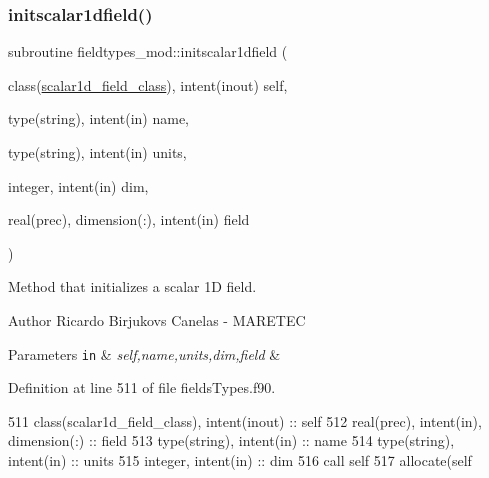 \subsubsection{\texorpdfstring{initscalar1dfield()}{initscalar1dfield()}}
{\footnotesize\ttfamily subroutine fieldtypes\+\_\+mod\+::initscalar1dfield (\begin{DoxyParamCaption}\item[{class(\mbox{\hyperlink{structfieldtypes__mod_1_1scalar1d__field__class}{scalar1d\+\_\+field\+\_\+class}}), intent(inout)}]{self,  }\item[{type(string), intent(in)}]{name,  }\item[{type(string), intent(in)}]{units,  }\item[{integer, intent(in)}]{dim,  }\item[{real(prec), dimension(\+:), intent(in)}]{field }\end{DoxyParamCaption})\hspace{0.3cm}{\ttfamily [private]}}



Method that initializes a scalar 1D field. 

\begin{DoxyAuthor}{Author}
Ricardo Birjukovs Canelas -\/ M\+A\+R\+E\+T\+EC 
\end{DoxyAuthor}

\begin{DoxyParams}[1]{Parameters}
\mbox{\tt in}  & {\em self,name,units,dim,field} & \\
\hline
\end{DoxyParams}


Definition at line 511 of file fields\+Types.\+f90.


\begin{DoxyCode}
511     \textcolor{keywordtype}{class}(scalar1d\_field\_class), \textcolor{keywordtype}{intent(inout)} :: self
512     \textcolor{keywordtype}{real(prec)}, \textcolor{keywordtype}{intent(in)}, \textcolor{keywordtype}{dimension(:)} :: field
513     \textcolor{keywordtype}{type}(string), \textcolor{keywordtype}{intent(in)} :: name
514     \textcolor{keywordtype}{type}(string), \textcolor{keywordtype}{intent(in)} :: units
515     \textcolor{keywordtype}{integer}, \textcolor{keywordtype}{intent(in)} :: dim
516     \textcolor{keyword}{call }self%
517     \textcolor{keyword}{allocate}(self%
\end{DoxyCode}
\mbox{\label{namespacefieldtypes__mod_a1a3160727c99017639d758aad9031df5}} 
